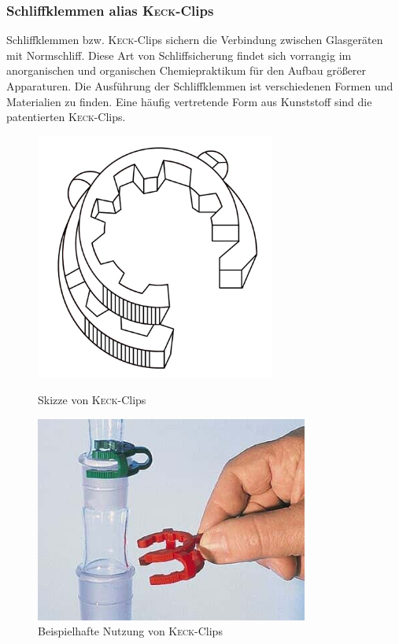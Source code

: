 \subsubsection{Schliffklemmen alias \textsc{Keck}-Clips}
Schliffklemmen bzw. \textsc{Keck}-Clips sichern die Verbindung zwischen Glasgeräten mit Normschliff. Diese Art von Schliffsicherung findet sich vorrangig im anorganischen und organischen Chemiepraktikum für den Aufbau größerer Apparaturen. Die Ausführung der Schliffklemmen ist verschiedenen Formen und Materialien zu finden. Eine häufig vertretende Form aus Kunststoff  sind die patentierten \textsc{Keck}-Clips.

\begin{figure}
	\begin{minipage}[b]{.45\textwidth} %
		\centering
		\includegraphics[width=0.7\textwidth]{img/keck_clips}
		\caption{Skizze von \textsc{Keck}-Clips}
	\end{minipage}
	\hspace{.1\linewidth}%
	\begin{minipage}[b]{.45\textwidth} %
		\centering
		\includegraphics[width=0.8\textwidth]{img/keck_clips_2}
		\caption{Beispielhafte Nutzung von \textsc{Keck}-Clips}
	\end{minipage}
\end{figure}
\FloatBarrier

